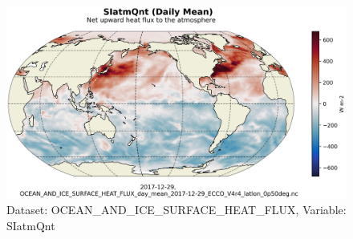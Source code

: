 \begin{figure}[H]
\centering
\includegraphics[scale=0.55]{../images/plots/latlon_plots/Ocean_and_Sea-Ice_Surface_Heat_Fluxes/SIatmQnt.png}
\caption{Dataset: OCEAN\_AND\_ICE\_SURFACE\_HEAT\_FLUX, Variable: SIatmQnt}
\label{tab:table-OCEAN_AND_ICE_SURFACE_HEAT_FLUX_SIatmQnt-Plot}
\end{figure}
\pagebreak
